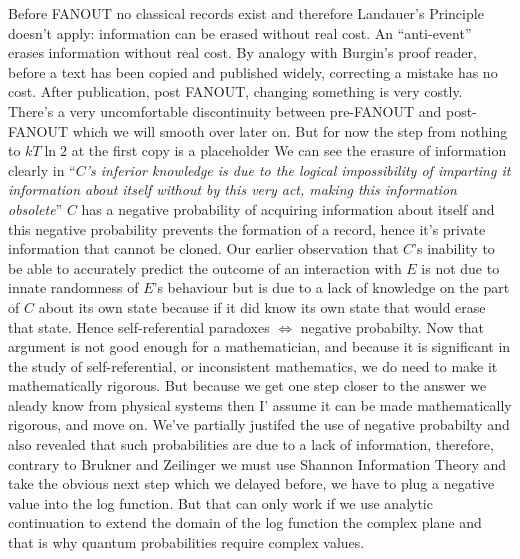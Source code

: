 Before FANOUT no classical records exist and therefore Landauer's Principle doesn't apply:
information can be erased without real cost. An \enquote{anti-event} erases information without
real cost. By analogy with Burgin's proof reader, before a text has been copied and published
widely, correcting a mistake has no cost. After publication, post FANOUT, changing something is
very costly. There's a very uncomfortable discontinuity between pre-FANOUT and post-FANOUT which we will smooth over later
on. But for now the step from nothing to $kT\ln 2$ at the first copy is a placeholder
We can see the erasure of information clearly in \enquote{{\emph{$C$'s inferior knowledge is due to
the logical impossibility of imparting it information about itself without by this very act, making
this information obsolete}}}
$C$ has a negative probability of acquiring information about itself and this negative
probability prevents the formation of a record, hence it's private information that cannot be
cloned. Our earlier observation that $C$'s inability to be able to accurately predict the
outcome of an interaction with $E$ is not due to innate randomness of $E$'s behaviour but is due
to a lack of knowledge on the part of $C$ about its own state because if it did know its own
state that would erase that state. Hence self-referential paradoxes $\iff$ negative probabilty.
\label{sec:complex-amplitudes}
Now that argument is not good enough for a mathematician, and because it is significant in the study
of self-referential, or inconsistent mathematics, we do need to make it mathematically rigorous.
But because we get one step closer to the answer we aleady know from physical systems then I' assume it
can be made mathematically rigorous, and move on. We've partially justifed the use of negative probabilty
and also revealed that such probabilities are due to a lack of information, therefore, contrary
to Brukner and Zeilinger \autocite{bruknerzeilinger2001shannon} we must use Shannon Information
Theory and take the obvious next step which we delayed before, we have to plug a negative value
into the log function. But that can only work if we use analytic continuation to extend the
domain of the log function the complex plane and that is why quantum probabilities require
complex values.

